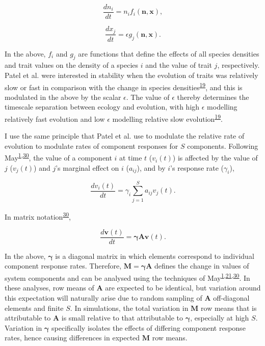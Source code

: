 \documentclass[]{article}
\begin{document}
\[\frac{dn_{i}}{dt} = n_{i}f_{i}(\mathbf{n}, \mathbf{x}),\]

\[\frac{dx_{j}}{dt} = \epsilon g_{j}(\mathbf{n}, \mathbf{x}).\]

In the above, \(f_{i}\) and \(g_{j}\) are functions that define the
effects of all species densities and trait values on the density of a
species \(i\) and the value of trait \(j\), respectively. Patel et al.
were interested in stability when the evolution of traits was relatively
slow or fast in comparison with the change in species
densities\textsuperscript{\protect\hyperlink{ref-Patel2018}{19}}, and
this is modulated in the above by the scalar \(\epsilon\). The value of
\(\epsilon\) thereby determines the timescale separation between ecology
and evolution, with high \(\epsilon\) modelling relatively fast
evolution and low \(\epsilon\) modelling relative slow
evolution\textsuperscript{\protect\hyperlink{ref-Patel2018}{19}}.

I use the same principle that Patel et al. use to modulate the relative
rate of evolution to modulate rates of component responses for \(S\)
components. Following
May\textsuperscript{\protect\hyperlink{ref-May1972}{1},\protect\hyperlink{ref-May1973}{30}},
the value of a component \(i\) at time \(t\) (\(v_{i}(t)\)) is affected
by the value of \(j\) (\(v_{j}(t)\)) and \(j\)'s marginal effect on
\(i\) (\(a_{ij}\)), and by \(i\)'s response rate (\(\gamma_{i}\)),

\[\frac{dv_{i}(t)}{dt} = \gamma_{i} \sum_{j=1}^{S}a_{ij}v_{j}(t).\]

In matrix notation\textsuperscript{\protect\hyperlink{ref-May1973}{30}},

\[\frac{d\mathbf{v}(t)}{dt} = \mathbf{\gamma} \mathbf{A}\mathbf{v}(t).\]

In the above, \(\mathbf{\gamma}\) is a diagonal matrix in which elements
correspond to individual component response rates. Therefore,
\(\mathbf{M} = \mathbf{\gamma} \mathbf{A}\) defines the change in values
of system components and can be analysed using the techniques of
May\textsuperscript{\protect\hyperlink{ref-May1972}{1},\protect\hyperlink{ref-Ahmadian2015}{21},\protect\hyperlink{ref-May1973}{30}}.
In these analyses, row means of \(\mathbf{A}\) are expected to be
identical, but variation around this expectation will naturally arise
due to random sampling of \(\mathbf{A}\) off-diagonal elements and
finite \(S\). In simulations, the total variation in \(\mathbf{M}\) row
means that is attributable to \(\mathbf{A}\) is small relative to that
attributable to \(\mathbf{\gamma}\), especially at high \(S\). Variation
in \(\mathbf{\gamma}\) specifically isolates the effects of differing
component response rates, hence causing differences in expected
\(\mathbf{M}\) row means.
\end{document}
